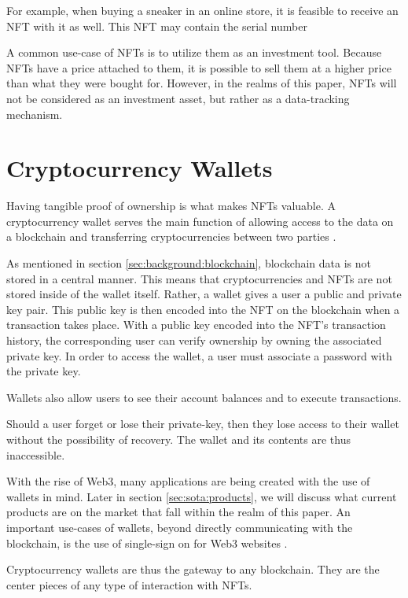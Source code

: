 
For example, when buying a sneaker in an online store, it is feasible to receive an NFT with it as well. This NFT may contain the serial number %

A common use-case of NFTs is to utilize them as an investment tool. Because NFTs have a price attached to them, it is possible to sell them at a higher price than what they were bought for. However, in the realms of this paper, NFTs will not be considered as an investment asset, but rather as a data-tracking mechanism. %

%
%
\section{Cryptocurrency Wallets}
\label{sec:bg_tech:wallets}

Having tangible proof of ownership is what makes NFTs valuable. A cryptocurrency wallet serves the main function of allowing access to the data on a blockchain and transferring cryptocurrencies between two parties \cite{wallets1}.

As mentioned in section \ref{sec:background:blockchain}, blockchain data is not stored in a central manner. This means that cryptocurrencies and NFTs are not stored inside of the wallet itself. Rather, a wallet gives a user a public and private key pair. This public key is then encoded into the NFT on the blockchain when a transaction takes place. With a public key encoded into the NFT's transaction history, the corresponding user can verify ownership by owning the associated private key. In order to access the wallet, a user must associate a password with the private key. \cite{wallets2}

Wallets also allow users to see their account balances and to execute transactions. 

Should a user forget or lose their private-key, then they lose access to their wallet without the possibility of recovery. The wallet and its contents are thus inaccessible. \cite{wallets2}

With the rise of Web3, many applications are being created with the use of wallets in mind. Later in section \ref{sec:sota:products}, we will discuss what current products are on the market that fall within the realm of this paper. An important use-cases of wallets, beyond directly communicating with the blockchain, is the use of single-sign on for Web3 websites \cite{walletConnect}.

Cryptocurrency wallets are thus the gateway to any blockchain. They are the center pieces of any type of interaction with NFTs.







